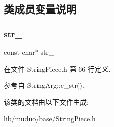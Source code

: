 \subsection{类成员变量说明}
\mbox{\label{classmuduo_1_1StringArg_a66ebb04af391bdd5bf2d55a010875cd0}} 
\subsubsection{\texorpdfstring{str\+\_\+}{str\_}}
{\footnotesize\ttfamily const char$\ast$ str\+\_\+\hspace{0.3cm}{\ttfamily [private]}}



在文件 String\+Piece.\+h 第 66 行定义.



参考自 String\+Arg\+::c\+\_\+str().



该类的文档由以下文件生成\+:\begin{DoxyCompactItemize}
\item 
lib/muduo/base/\hyperlink{StringPiece_8h}{String\+Piece.\+h}\end{DoxyCompactItemize}
